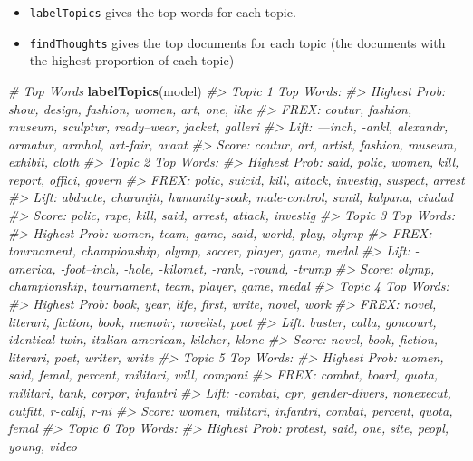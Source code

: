 \documentclass[]{book}
\newenvironment{Shaded}{\begin{snugshade}}{\end{snugshade}}
\newcommand{\CommentTok}[1]{\textcolor[rgb]{0.56,0.35,0.01}{\textit{#1}}}
\newcommand{\KeywordTok}[1]{\textcolor[rgb]{0.13,0.29,0.53}{\textbf{#1}}}
\newcommand{\NormalTok}[1]{#1}
\providecommand{\tightlist}{%
  \setlength{\itemsep}{0pt}\setlength{\parskip}{0pt}}
\begin{document}
\begin{itemize}
\tightlist
\item
  \texttt{labelTopics} gives the top words for each topic.
\item
  \texttt{findThoughts} gives the top documents for each topic (the documents with the highest proportion of each topic)
\end{itemize}

\begin{Shaded}
\begin{Highlighting}[]
\CommentTok{# Top Words}
\KeywordTok{labelTopics}\NormalTok{(model)}
\CommentTok{#> Topic 1 Top Words:}
\CommentTok{#>       Highest Prob: show, design, fashion, women, art, one, like }
\CommentTok{#>       FREX: coutur, fashion, museum, sculptur, ready--wear, jacket, galleri }
\CommentTok{#>       Lift: ---inch, -ankl, alexandr, armatur, armhol, art-fair, avant }
\CommentTok{#>       Score: coutur, art, artist, fashion, museum, exhibit, cloth }
\CommentTok{#> Topic 2 Top Words:}
\CommentTok{#>       Highest Prob: said, polic, women, kill, report, offici, govern }
\CommentTok{#>       FREX: polic, suicid, kill, attack, investig, suspect, arrest }
\CommentTok{#>       Lift: abducte, charanjit, humanity-soak, male-control, sunil, kalpana, ciudad }
\CommentTok{#>       Score: polic, rape, kill, said, arrest, attack, investig }
\CommentTok{#> Topic 3 Top Words:}
\CommentTok{#>       Highest Prob: women, team, game, said, world, play, olymp }
\CommentTok{#>       FREX: tournament, championship, olymp, soccer, player, game, medal }
\CommentTok{#>       Lift: -america, -foot--inch, -hole, -kilomet, -rank, -round, -trump }
\CommentTok{#>       Score: olymp, championship, tournament, team, player, game, medal }
\CommentTok{#> Topic 4 Top Words:}
\CommentTok{#>       Highest Prob: book, year, life, first, write, novel, work }
\CommentTok{#>       FREX: novel, literari, fiction, book, memoir, novelist, poet }
\CommentTok{#>       Lift: buster, calla, goncourt, identical-twin, italian-american, kilcher, klone }
\CommentTok{#>       Score: novel, book, fiction, literari, poet, writer, write }
\CommentTok{#> Topic 5 Top Words:}
\CommentTok{#>       Highest Prob: women, said, femal, percent, militari, will, compani }
\CommentTok{#>       FREX: combat, board, quota, militari, bank, corpor, infantri }
\CommentTok{#>       Lift: -combat, cpr, gender-divers, nonexecut, outfitt, r-calif, r-ni }
\CommentTok{#>       Score: women, militari, infantri, combat, percent, quota, femal }
\CommentTok{#> Topic 6 Top Words:}
\CommentTok{#>       Highest Prob: protest, said, one, site, peopl, young, video }

\end{Highlighting}
\end{Shaded}
\end{document}
